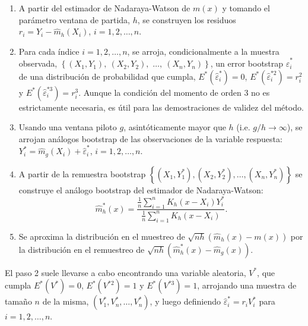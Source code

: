 \documentclass[
]{book}
\theoremstyle{break}
\theoremstyle{definition}
\theoremstyle{definition}
\theoremstyle{definition}
\theoremstyle{definition}
\theoremstyle{remark}
\begin{document}
\begin{enumerate}
\def\labelenumi{\arabic{enumi}.}
\item
  A partir del estimador de Nadaraya-Watson de \(m\left( x \right)\) y
  tomando el parámetro ventana de partida, \(h\), se construyen los
  residuos
  \(r_i = Y_i - \hat{m}_{h}\left( X_i \right)\),
  \(i=1, 2, \ldots, n\).
\item
  Para cada índice \(i=1,2,\ldots ,n\), se arroja, condicionalmente a la
  muestra observada, \(\left\{ \left( X_1,Y_1 \right), \ \left( X_2,Y_2 \right),\right.\)
  \(\left.\ldots ,\ \left( X_n,Y_n \right) \right\}\),
  un error bootstrap \(\hat{\varepsilon}_i^{\ast}\) de una
  distribución de probabilidad que cumpla,
  \(E^{\ast}\left( \hat{\varepsilon}_i^{\ast} \right) =0\),
  \(E^{\ast}\left( \hat{\varepsilon}_i^{\ast 2} \right) =r_i^2\) y
  \(E^{\ast}\left( \hat{\varepsilon}_i^{\ast 3} \right) =r_i^{3}\).
  Aunque la condición del momento de orden 3 no es estrictamente necesaria,
  es útil para las demostraciones de validez del método.
\item
  Usando una ventana piloto \(g\), asintóticamente mayor que \(h\) (i.e.
  \(g/h\rightarrow \infty\)), se arrojan análogos bootstrap de las
  observaciones de la variable respuesta:
  \(Y_i^{\ast}=\hat{m}_{g}\left(X_i \right)  +\hat{\varepsilon}_i^{\ast}\), \(i=1,2,\ldots ,n\).
\item
  A partir de la remuestra bootstrap \(\left\{ \left( X_1,Y_1^{\ast } \right),\left( X_2,Y_2^{\ast} \right),\ldots ,\left( X_n,Y_n^{\ast} \right) \right\}\) se construye el análogo
  bootstrap del estimador de Nadaraya-Watson:
  \[\hat{m}_{h}^{\ast}\left( x \right) =\frac{\frac{1}{n}\sum_{i=1}^{n}K_{h}
  \left( x-X_i \right) Y_i^{\ast}}{\frac{1}{n}\sum_{i=1}^{n}K_{h}\left(
  x-X_i \right)}.\]
\item
  Se aproxima la distribución en el muestreo de \(\sqrt{nh}\left( \hat{m}_{h}\left( x \right) -m\left( x \right) \right)\) por la
  distribución en el remuestreo de
  \(\sqrt{nh}\left( \hat{m}_{h}^{\ast}\left( x \right) - \hat{m}_{g}\left( x \right) \right)\).
\end{enumerate}

El paso 2 suele llevarse a cabo encontrando una variable aleatoria,
\(V^{\ast}\), que cumpla \(E^{\ast}\left( V^{\ast} \right) =0\), \(E^{\ast}\left( V^{\ast 2} \right) =1\) y \(E^{\ast}\left( V^{\ast 3} \right) =1\),
arrojando una muestra de tamaño \(n\) de la misma,
\(\left( V_1^{\ast},V_n^{\ast},\ldots ,V_n^{\ast} \right)\), y luego
definiendo \(\hat{\varepsilon}_i^{\ast} = r_iV_i^{\ast}\)
para \(i=1, 2, \ldots, n\).
\end{document}
